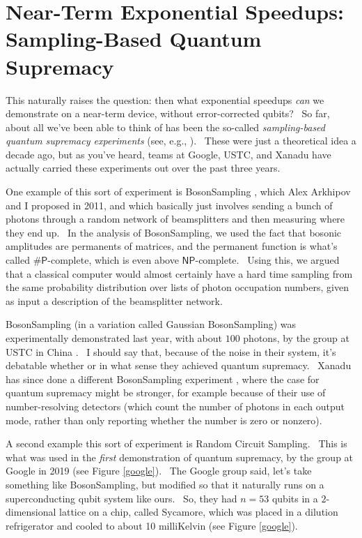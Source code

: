 \documentclass[11pt]{article}
\begin{document}
\section{Near-Term Exponential Speedups: Sampling-Based Quantum Supremacy}

This naturally raises the question: then what exponential speedups \emph{can} we demonstrate on a near-term device, without error-corrected qubits? \ So far, about all we've been able to think of has been the so-called \emph{sampling-based quantum supremacy experiments} (see, e.g., \cite{aark,achen,bjs}). \ These were just a theoretical idea a decade ago, but as you've heard, teams at Google, USTC, and Xanadu have actually carried these experiments out over the past three years.

One example of this sort of experiment is BosonSampling \cite{aark}, which Alex Arkhipov and I proposed in 2011, and which basically just involves sending a bunch of photons through a random network of beamsplitters and then measuring where they end up. \ In the analysis of BosonSampling, we used the fact that bosonic amplitudes are permanents of matrices, and the permanent function is what's called $\mathsf{\#P}$-complete, which is even above $\mathsf{NP}$-complete. \ Using this, we argued that a classical computer would almost certainly have a hard time sampling from the same probability distribution over lists of photon occupation numbers, given as input a description of the beamsplitter network.

BosonSampling (in a variation called Gaussian BosonSampling) was experimentally demonstrated last year, with about $100$ photons, by the group at USTC in China \cite{ustc}. \ I should say that, because of the noise in their system, it's debatable whether or in what sense they achieved quantum supremacy. \ Xanadu has since done a different BosonSampling experiment \cite{xanadu}, where the case for quantum supremacy might be stronger, for example because of their use of number-resolving detectors (which count the number of photons in each output mode, rather than only reporting whether the number is zero or nonzero).

A second example this sort of experiment is Random Circuit Sampling. \ This is what was used in the \emph{first} demonstration of quantum supremacy, by the group at Google in 2019 \cite{arute} (see Figure \ref{google}). \ The Google group said, let's take something like BosonSampling, but modified so that it naturally runs on a superconducting qubit system like ours. \ So, they had $n=53$ qubits in a $2$-dimensional lattice on a chip, called Sycamore, which was placed in a dilution refrigerator and cooled to about 10 milliKelvin (see Figure \ref{google}).
\end{document}
